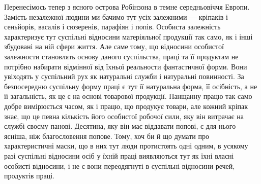 Перенесімось тепер з ясного острова Робінзона в темне середньовіччя
Европи. Замість незалежної людини ми бачимо тут усіх
залежними — кріпаків і сеньйорів, васалів і сюзеренів, парафіян
і попів. Особиста залежність характеризує тут суспільні відносини
матеріяльної продукції так само, як і інші збудовані на ній сфери
життя. Але саме тому, що відносини особистої залежности становлять
основу даного суспільства, праці та її продуктам не потрібно
набирати відмінної від їхньої реальности фантастичної
форми. Вони увіходять у суспільний рух як натуральні служби
і натуральні повинності. За безпосередню суспільну форму праці
є тут її натуральна форма, її осібність, а не її загальність, як це
є на основі товарової продукції. Панщанну працю так само добре
вимірюється часом, як і працю, що продукує товари, але кожний
кріпак знає, що це певна кількість його особистої робочої сили,
яку він витрачає на службі своєму панові. Десятина, яку він має
віддавати попові, є для нього ясніша, ніж благословення попове.
Тому, хоч би й що думати про характеристичні маски, що в них
тут люди протистоять одні одним, в усякому разі суспільні відносини
осіб у їхній праці виявляються тут як їхні власні особисті
відносини, і не є вони переодягнуті в суспільні відносини речей,
продуктів праці.

